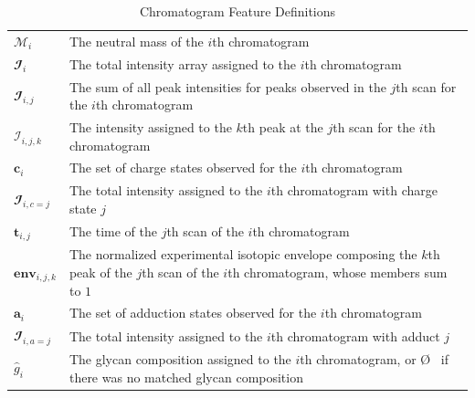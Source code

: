 \documentclass{article}
\begin{document}
    \renewcommand{\arraystretch}{1.5}
    \begin{table}
        \caption{Chromatogram Feature Definitions}\label{tbl:chromatogram_feature_definitions}
        \centering
        \begin{tabular}{l | p{9cm}}
            \hline
            $\mathcal{M}_i$ & The neutral mass of the $i$th chromatogram\\
            $\mathbfcal{I}_i$ & The total intensity array assigned to the $i$th chromatogram\\
            $\mathbfcal{I}_{i, j}$ & The sum of all peak intensities for peaks observed in
                                             the $j$th scan for the $i$th chromatogram\\
            $\mathcal{I}_{i, j, k}$ & The intensity assigned to the $k$th peak at the $j$th
                                      scan for the $i$th chromatogram\\
            $\mathbf{c}_i$ & The set of charge states observed for the $i$th chromatogram\\
            $\mathbfcal{I}_{i, c=j}$ & The total intensity assigned to the $i$th chromatogram
                                     with charge state $j$\\
            $\mathbf{t}_{i, j}$ & The time of the $j$th scan of the $i$th chromatogram\\
            $\textbf{env}_{i, j, k}$ & The normalized experimental isotopic envelope composing
                                     the $k$th peak of the $j$th scan of the $i$th chromatogram,
                                     whose members sum to $1$\\
            $\mathbf{a}_i$ & The set of adduction states observed for the $i$th chromatogram\\
            $\mathbfcal{I}_{i, a=j}$ & The total intensity assigned to the $i$th
                                                 chromatogram with adduct $j$\\
            ${\hat g}_i$ & The glycan composition assigned to the $i$th chromatogram, or \O
                           \ if there was no matched glycan composition
        \end{tabular}
    \end{table}
    \renewcommand{\arraystretch}{1.0}
\end{document}

